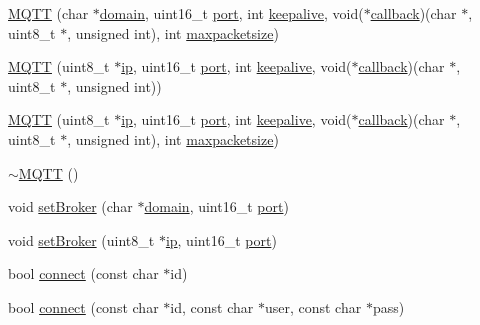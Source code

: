 \begin{DoxyCompactItemize}
\item 
\hyperlink{class_m_q_t_t_a418f1aaefd9ebb233358a532d82d2307}{M\+Q\+TT} (char $\ast$\hyperlink{class_m_q_t_t_a36cef0e2c168c4ce68dda653df6e3be1}{domain}, uint16\+\_\+t \hyperlink{class_m_q_t_t_a27559174e21256b6235ff281ba605fe8}{port}, int \hyperlink{class_m_q_t_t_af93aeb459130c36b2a8d894011f10492}{keepalive}, void($\ast$\hyperlink{class_m_q_t_t_ad40d1645b7ec6c7b969883825f0c0469}{callback})(char $\ast$, uint8\+\_\+t $\ast$, unsigned int), int \hyperlink{class_m_q_t_t_aac8cf32807b542ce45a9060d9769f35e}{maxpacketsize})
\item 
\hyperlink{class_m_q_t_t_ad68f2a18a197fa8944e8cc8e1950af5a}{M\+Q\+TT} (uint8\+\_\+t $\ast$\hyperlink{class_m_q_t_t_a70618323bb75b467ed054dd191397b37}{ip}, uint16\+\_\+t \hyperlink{class_m_q_t_t_a27559174e21256b6235ff281ba605fe8}{port}, int \hyperlink{class_m_q_t_t_af93aeb459130c36b2a8d894011f10492}{keepalive}, void($\ast$\hyperlink{class_m_q_t_t_ad40d1645b7ec6c7b969883825f0c0469}{callback})(char $\ast$, uint8\+\_\+t $\ast$, unsigned int))
\item 
\hyperlink{class_m_q_t_t_a86aa31266ec2193bdd166e9fcd8c9d79}{M\+Q\+TT} (uint8\+\_\+t $\ast$\hyperlink{class_m_q_t_t_a70618323bb75b467ed054dd191397b37}{ip}, uint16\+\_\+t \hyperlink{class_m_q_t_t_a27559174e21256b6235ff281ba605fe8}{port}, int \hyperlink{class_m_q_t_t_af93aeb459130c36b2a8d894011f10492}{keepalive}, void($\ast$\hyperlink{class_m_q_t_t_ad40d1645b7ec6c7b969883825f0c0469}{callback})(char $\ast$, uint8\+\_\+t $\ast$, unsigned int), int \hyperlink{class_m_q_t_t_aac8cf32807b542ce45a9060d9769f35e}{maxpacketsize})
\item 
\hyperlink{class_m_q_t_t_a07b8f99719144b5d3bc8d8d817de3e8e}{$\sim$\+M\+Q\+TT} ()
\item 
void \hyperlink{class_m_q_t_t_a07b3b97bcf999a2d0a292bca4f29bbc7}{set\+Broker} (char $\ast$\hyperlink{class_m_q_t_t_a36cef0e2c168c4ce68dda653df6e3be1}{domain}, uint16\+\_\+t \hyperlink{class_m_q_t_t_a27559174e21256b6235ff281ba605fe8}{port})
\item 
void \hyperlink{class_m_q_t_t_ad17765f1a34eacf2f0a3b384181a7129}{set\+Broker} (uint8\+\_\+t $\ast$\hyperlink{class_m_q_t_t_a70618323bb75b467ed054dd191397b37}{ip}, uint16\+\_\+t \hyperlink{class_m_q_t_t_a27559174e21256b6235ff281ba605fe8}{port})
\item 
bool \hyperlink{class_m_q_t_t_ae76d538b01191df33610a950bf4e9717}{connect} (const char $\ast$id)
\item 
bool \hyperlink{class_m_q_t_t_a280e592fced51964607c66f7ab450b46}{connect} (const char $\ast$id, const char $\ast$user, const char $\ast$pass)

\end{DoxyCompactItemize}
